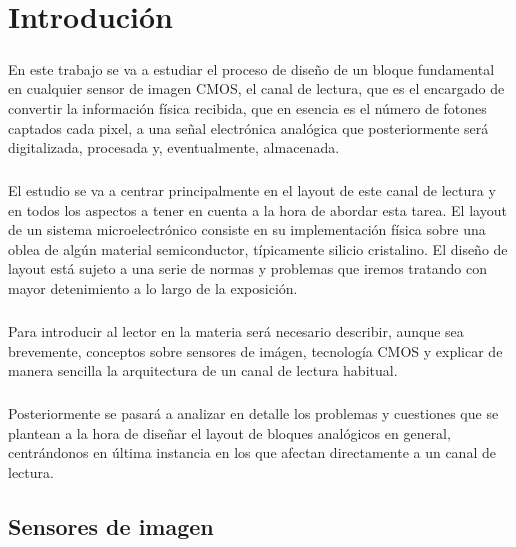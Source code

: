 \chapter{Introdución}\label{cap:intro}

\paragraph{}
En este trabajo se va a estudiar el proceso de diseño de un bloque fundamental
en cualquier sensor de imagen CMOS, el canal de lectura, que es el encargado
de convertir la información física recibida, que en esencia es el número de fotones
captados cada pixel, a una señal electrónica analógica que posteriormente será digitalizada,
procesada y, eventualmente, almacenada.

\paragraph{}
El estudio se va a centrar principalmente en el layout de este canal de
lectura y en todos los aspectos a tener en cuenta a la hora de abordar esta tarea.
El layout de un sistema microelectrónico consiste en su implementación física
sobre una oblea de algún material semiconductor, típicamente silicio cristalino. El
diseño de layout está sujeto a una serie de normas y problemas que iremos tratando
con mayor detenimiento a lo largo de la exposición.

\paragraph{}
Para introducir al lector en la materia será necesario describir, aunque sea
brevemente, conceptos sobre sensores de imágen, tecnología CMOS y explicar de manera
sencilla la arquitectura de un canal de lectura habitual.

\paragraph{}
Posteriormente se pasará a analizar en detalle los problemas y cuestiones que se
plantean a la hora de diseñar el layout de bloques analógicos en general,
centrándonos en última instancia en los que afectan directamente a un canal de lectura.

\section{Sensores de imagen}\label{cap:image_sensors}

